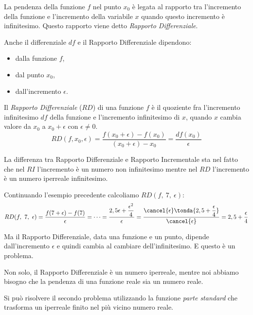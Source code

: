La pendenza della funzione \(f\) nel punto \(x_0\) è legata al 
rapporto tra l'incremento della funzione e l'incremento della variabile 
\(x\) quando questo incremento è infinitesimo. 
Questo rapporto viene detto \emph{Rapporto Differenziale}.

Anche il differenziale \(df\) e il Rapporto Differenziale dipendono: 
\begin{multicols}{3}
\begin{itemize} [nosep]
\item dalla funzione \(f\), 
\item dal punto \(x_0\), 
\item dall'incremento \(\epsilon\).
\end{itemize}
\end{multicols}
\begin{definizione}
Il \emph{Rapporto Differenziale} (\(RD\)) di una funzione \(f\) è il 
quoziente fra l'incremento infinitesimo \(df\) della funzione 
e l'incremento infinitesimo di \(x\), quando \(x\) cambia valore da 
\(x_0\) a \(x_0+\epsilon\) con \(\epsilon \ne 0\).
\[RD(f, x_0, \epsilon) = 
\frac{f(x_0+\epsilon)-f(x_0)}{(x_0+\epsilon)- x_0} =
\frac{df(x_0)}{\epsilon}\]
\end{definizione}
La differenza tra Rapporto Differenziale e Rapporto Incrementale sta nel 
fatto che nel \(RI\) l'incremento è un numero non infinitesimo mentre 
nel \(RD\) l'incremento è un numero iperreale infinitesimo.

Continuando l'esempio precedente calcoliamo \(RD(f,~7,~\epsilon)\):
\[RD(f,~7,~\epsilon) =
 \frac{f(7+\epsilon) - f(7)}{\epsilon}=\dots=
 \frac{2,5 \epsilon + \dfrac{\epsilon^2}{4}}{\epsilon}=
 \frac{\cancel{\epsilon}\tonda{2,5 + \dfrac{\epsilon}{4}}}
 {\cancel{\epsilon}}=
 2,5 + \frac{\epsilon}{4}
\]

Ma il Rapporto Differenziale, data una funzione e un punto, dipende 
dall'incremento \(\epsilon\) e quindi cambia al cambiare dell'infinitesimo. 
E questo è un problema. 

Non solo, il Rapporto Differenziale è un numero iperreale, mentre noi 
abbiamo bisogno che la pendenza di una funzione reale sia un numero reale.

Si può risolvere il secondo problema utilizzando la funzione 
\emph{parte standard} che trasforma un iperreale finito nel più vicino
numero reale.

